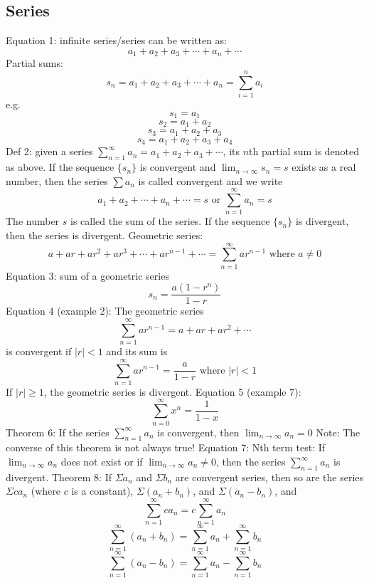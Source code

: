 \documentclass{article}
\begin{document}
    \subsection{Series}
    \begin{outline}
        \1 Equation 1: infinite series/series can be written as: \[a_1+a_2+a_3+\cdots+a_n+\cdots\]
        \1 Partial sums: \[s_n=a_1+a_2+a_3+\cdots+a_n=\sum^n_{i=1}a_i\] e.g. \[s_1=a_1\]\[s_2=a_1+a_2\]\[s_3=a_1+a_2+a_3\]\[s_4=a_1+a_2+a_3+a_4\]
        \1 Def 2: given a series \(\sum^\infty_{n=1}a_n=a_1+a_2+a_3+\cdots\), its $n$th partial sum is denoted as above.
            \2 If the sequence \(\{s_n\}\) is convergent and \(\lim_{n\to\infty}s_n=s\) exists as a real number, then the series \(\sum a_n\) is called convergent and we write \[a_1+a_2+\cdots+a_n+\cdots=s\mbox{ or }\sum^\infty_{n=1}a_n=s\]
            \2 The number $s$ is called the sum of the series. If the sequence \(\{s_n\}\) is divergent, then the series is divergent. 
        \1 Geometric series: \[a+ar+ar^2+ar^3+\cdots+ar^{n-1}+\cdots=\sum^\infty_{n=1}ar^{n-1}\mbox{ where }a\neq0\]
        \1 Equation 3: sum of a geometric series \[s_n=\dfrac{a\left(1-r^n\right)}{1-r}\]
        \1 Equation 4 (example 2): The geometric series \[\sum^\infty_{n=1}ar^{n-1}=a+ar+ar^2+\cdots\] is convergent if \(|r|<1\) and its sum is \[\sum^\infty_{n=1}ar^{n-1}=\dfrac{a}{1-r}\mbox{ where }|r|<1\] If \(|r|\geq1\), the geometric series is divergent. 
        \1 Equation 5 (example 7): \[\sum^\infty_{n=0}x^n=\dfrac{1}{1-x}\]
        \1 Theorem 6: If the series \(\sum^\infty_{n=1}a_n\) is convergent, then \(\lim_{n\to\infty}a_n=0\)
            \2 Note: The converse of this theorem is not always true!
        \1 Equation 7: Nth term test: If \(\lim_{n\to\infty}a_n\) does not exist or if \(\lim_{n\to\infty}a_n\neq0\), then the series \(\sum_{n=1}^\infty a_n\) is divergent. 
        \1 Theorem 8: If \(\Sigma a_n\) and \(\Sigma b_n\) are convergent series, then so are the series \(\Sigma ca_n\) (where $c$ is a constant), \(\Sigma\left(a_n+b_n\right)\), and \(\Sigma\left(a_n-b_n\right)\), and \[\sum^\infty_{n=1}ca_n=c\sum^\infty_{n=1}a_n\]\[\sum^\infty_{n=1}\left(a_n+b_n\right)=\sum^\infty_{n=1}a_n+\sum^\infty_{n=1}b_n\]\[\sum^\infty_{n=1}\left(a_n-b_n\right)=\sum^\infty_{n=1}a_n-\sum^\infty_{n=1}b_n\]

    \end{outline}
\end{document}
